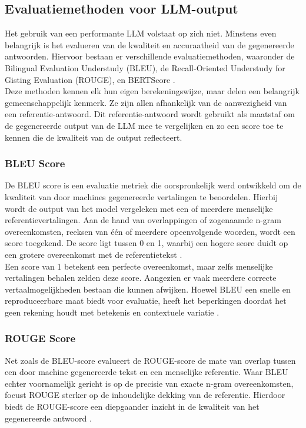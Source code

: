 \subsection{Evaluatiemethoden voor LLM-output}
Het gebruik van een performante LLM volstaat op zich niet. Minstens even belangrijk is het evalueren van de kwaliteit en accuraatheid van de gegenereerde antwoorden. Hiervoor bestaan er verschillende evaluatiemethoden, waaronder de Bilingual Evaluation Understudy (BLEU), de Recall-Oriented Understudy for Gisting Evaluation (ROUGE), en BERTScore \autocite{microsoft2024evaluation}.
\\[1em]
Deze methoden kennen elk hun eigen berekeningswijze, maar delen een belangrijk gemeenschappelijk kenmerk. Ze zijn allen afhankelijk van de aanwezigheid van een referentie-antwoord. Dit referentie-antwoord wordt gebruikt als maatstaf om de gegenereerde output van de LLM mee te vergelijken en zo een score toe te kennen die de kwaliteit van de output reflecteert\autocite{microsoft2024evaluation}.

\subsubsection{BLEU Score}

De BLEU score is een evaluatie metriek die oorspronkelijk werd ontwikkeld om de kwaliteit van door machines gegenereerde vertalingen te beoordelen. Hierbij wordt de output van het model vergeleken met een of meerdere menselijke referentievertalingen. Aan de hand van overlappingen of zogenaamde n-gram overeenkomsten, reeksen van één of meerdere opeenvolgende woorden, wordt een score toegekend. De score ligt tussen 0 en 1, waarbij een hogere score duidt op een grotere overeenkomst met de referentietekst \autocite{papineni-etal-2002-bleu}.
\\[1em]
Een score van 1 betekent een perfecte overeenkomst, maar zelfs menselijke vertalingen behalen zelden deze score. Aangezien er vaak meerdere correcte vertaalmogelijkheden bestaan die kunnen afwijken. Hoewel BLEU een snelle en reproduceerbare maat biedt voor evaluatie, heeft het beperkingen doordat het geen rekening houdt met betekenis en contextuele variatie \autocite{papineni-etal-2002-bleu}.

\subsubsection{ROUGE Score}

Net zoals de BLEU-score evalueert de ROUGE-score de mate van overlap tussen een door machine gegenereerde tekst en een menselijke referentie. Waar BLEU echter voornamelijk gericht is op de precisie van exacte n-gram overeenkomsten, focust ROUGE sterker op de inhoudelijke dekking van de referentie. Hierdoor biedt de ROUGE-score een diepgaander inzicht in de kwaliteit van het gegenereerde antwoord \autocite{ganesan2018rouge20updatedimproved}.

